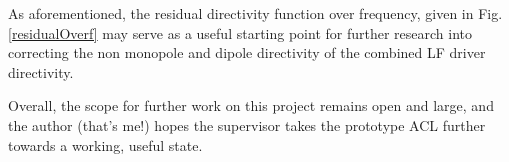 \documentclass{report}
\begin{document}
    As aforementioned, the residual directivity function over frequency, given in Fig. \ref{residualOverf} may serve as a useful starting point for further research into correcting the non monopole and dipole directivity of the combined LF driver directivity.

    Overall, the scope for further work on this project remains open and large, and the author (that's me!) hopes the supervisor takes the prototype ACL further towards a working, useful state.



\end{document}
